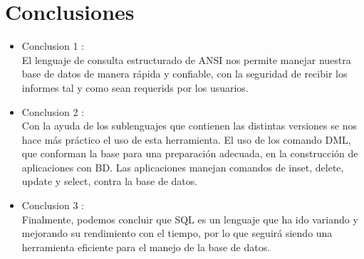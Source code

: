 \documentclass[preprint,12pt]{elsarticle}
\begin{document}
\section{Conclusiones}
\begin{itemize}
\item Conclusion 1 : \\ El lenguaje de consulta estructurado de ANSI nos permite manejar nuestra base de datos de manera rápida y confiable, con la seguridad de recibir los informes tal y como sean requerids por los usuarios.

\item Conclusion 2 : \\ Con la ayuda de los sublenguajes que contienen las distintas versiones se nos hace más práctico el uso de esta herramienta. El uso de los comando DML, que conforman la base para una preparación adecuada, en la construcción de aplicaciones con BD. Las aplicaciones manejan comandos de inset, delete, update y select, contra la base de datos.

\item Conclusion 3 : \\ Finalmente, podemos concluir que SQL es un lenguaje que ha ido variando y mejorando su rendimiento con el tiempo, por lo que seguirá siendo una herramienta eficiente para el manejo de la base de datos.



\end{itemize}
	
	

	\newpage
	
		 


	
	
	
\end{document}
